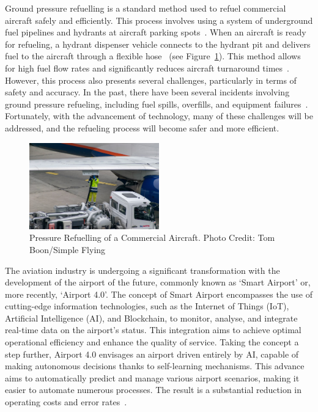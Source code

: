 \documentclass[12pt,oneside]{book} %
\begin{document}
Ground pressure refuelling is a standard method used to refuel commercial
aircraft safely and efficiently. This process involves using a system of
underground fuel pipelines and hydrants at aircraft parking
spots~\cite{blakey2011aviation}. When an aircraft is ready for refueling, a
hydrant dispenser vehicle connects to the hydrant pit and delivers fuel to the
aircraft through a flexible hose~\cite{sati2019aircraft} (see
Figure~\ref{fig:pressure-refuelling}). This method allows for high fuel flow
rates and significantly reduces aircraft turnaround
times~\cite{blakey2011aviation}. However, this process also presents several
challenges, particularly in terms of safety and accuracy. In the past, there
have been several incidents involving ground pressure refueling, including fuel
spills, overfills, and equipment
failures~\cite{doi:10.1080/13669877.2013.879493, CostsOfUnsafetyAviation}.
Fortunately, with the advancement of technology, many of these challenges will
be addressed, and the refueling process will become safer and more efficient. 

\begin{figure}[H]
    \centering
    \includegraphics[width=0.5\textwidth]{figures/pressure-refuelling.jpeg}
    \caption{Pressure Refuelling of a Commercial Aircraft. Photo Credit: Tom Boon/Simple Flying~\cite{ImageRefueling}}\label{fig:pressure-refuelling}
\end{figure}

The aviation industry is undergoing a significant transformation with the
development of the airport of the future, commonly known as `Smart Airport’ or,
more recently, `Airport 4.0’. The concept of Smart Airport encompasses the use
of cutting-edge information technologies, such as the Internet of Things (IoT),
Artificial Intelligence (AI), and Blockchain, to monitor, analyse, and
integrate real-time data on the airport's status. This integration aims to
achieve optimal operational efficiency and enhance the quality of service.
Taking the concept a step further, Airport 4.0 envisages an airport driven
entirely by AI, capable of making autonomous decisions thanks to self-learning
mechanisms. This advance aims to automatically predict and manage various
airport scenarios, making it easier to automate numerous processes. The result
is a substantial reduction in operating costs and error
rates~\cite{10.1007/978-981-16-5943-0_26}.
\end{document}
